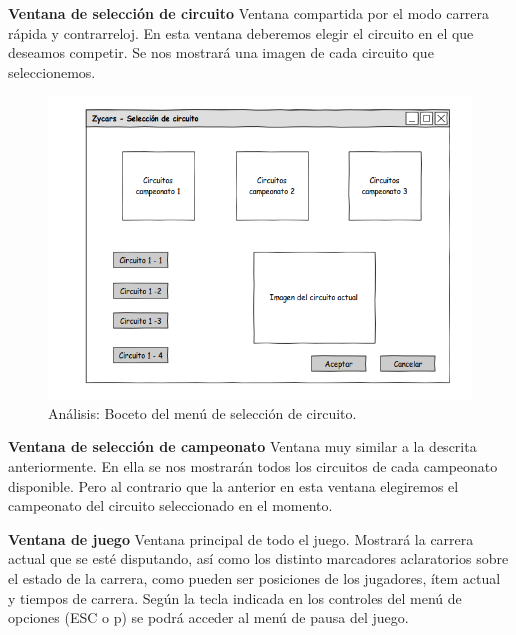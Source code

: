 \begin{description}
    \item \textbf{Ventana de selección de circuito} Ventana compartida por el modo carrera rápida y contrarreloj. En esta ventana
    deberemos elegir el circuito en el que deseamos competir. Se nos mostrará una imagen de cada circuito que seleccionemos.

        \begin{figure}[H]
          \label{diagrama_casos_uso}
          \begin{center}
            \includegraphics[scale=0.42]{imagenes/analisis/boceto_menu_circuito.png}
          \end{center}
          \caption{Análisis: Boceto del menú de selección de circuito.}
        \end{figure}
    
    \item \textbf{Ventana de selección de campeonato} Ventana muy similar a la descrita anteriormente. En ella se nos mostrarán
    todos los circuitos de cada campeonato disponible. Pero al contrario que la anterior en esta ventana elegiremos el campeonato 
    del circuito seleccionado en el momento.
    
    \item \textbf{Ventana de juego} Ventana principal de todo el juego. Mostrará la carrera actual que se esté disputando, así como
    los distinto marcadores aclaratorios sobre el estado de la carrera, como
    pueden ser posiciones de los jugadores, ítem actual y
    tiempos de carrera. Según la tecla indicada en los controles del menú de opciones (ESC o p) se podrá acceder al menú
    de pausa del juego.


\end{description}
